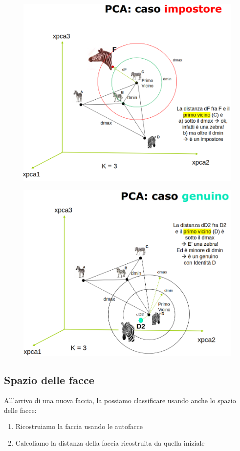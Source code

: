 \documentclass{report}
\begin{document}
\begin{figure}[H]
    \centering
    \includegraphics[width=0.9\linewidth]{images/impostore.png}
\end{figure}

\begin{figure}[H]
    \centering
    \includegraphics[width=0.9\linewidth]{images/imm-genuino.png}
\end{figure}

\subsection{Spazio delle facce}
All'arrivo di una nuova faccia, la possiamo classificare
usando anche lo spazio delle facce:
\begin{enumerate}
    \item Ricostruiamo la faccia usando le autofacce
    \item Calcoliamo la distanza della faccia ricostruita da quella iniziale
\end{enumerate}
\end{document}
